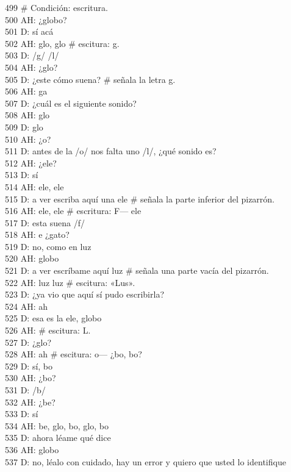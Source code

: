 499 \# Condición: escritura.\\
500 AH: ¿globo?\\
501 D: sí acá\\
502 AH: glo, glo \# escitura: g.\\
503 D: /g/ /l/\\
504 AH: ¿glo?\\
505 D: ¿este cómo suena? \# señala la letra g.\\
506 AH: ga\\
507 D: ¿cuál es el siguiente sonido?\\
508 AH: glo\\
509 D: glo\\
510 AH: ¿o?\\
511 D: antes de la /o/ nos falta uno /l/, ¿qué sonido es?\\
512 AH: ¿ele?\\
513 D: sí\\
514 AH: ele, ele\\
515 D: a ver escriba aquí una ele \# señala la parte inferior del pizarrón.\\
516 AH: ele, ele \# escritura: F--- ele\\
517 D: esta suena /f/\\
518 AH: e ¿gato?\\
519 D: no, como en luz\\
520 AH: globo\\
521 D: a ver escríbame aquí luz \# señala una parte vacía del pizarrón.\\
522 AH: luz luz \# escitura: «Lus».\\
523 D: ¿ya vio que aquí sí pudo escribirla?\\
524 AH: ah\\
525 D: esa es la ele, globo\\
526 AH: \# escitura: L.\\
527 D: ¿glo?\\
528 AH: ah \# escitura: o--- ¿bo, bo?\\
529 D: sí, bo\\
530 AH: ¿bo?\\
531 D: /b/\\
532 AH: ¿be?\\
533 D: sí\\
534 AH: be, glo, bo, glo, bo\\
535 D: ahora léame qué dice\\
536 AH: globo\\
537 D: no, léalo con cuidado, hay un error y quiero que usted lo identifique\\
